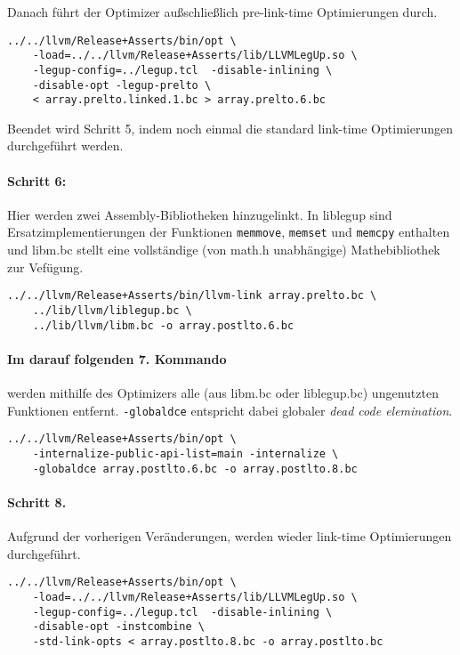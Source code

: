 \documentclass[oneside,a4paper]{article}
\def\B#1{\lstinline[style=bash]{#1}}
\def\C#1{\lstinline[style=c]{#1}}
\begin{document}
Danach führt der Optimizer außschließlich pre-link-time Optimierungen durch.
\begin{lstlisting}[style=bash]
../../llvm/Release+Asserts/bin/opt \
    -load=../../llvm/Release+Asserts/lib/LLVMLegUp.so \
    -legup-config=../legup.tcl  -disable-inlining \
    -disable-opt -legup-prelto \
    < array.prelto.linked.1.bc > array.prelto.6.bc
\end{lstlisting}

Beendet wird Schritt 5, indem noch einmal die standard link-time Optimierungen
durchgeführt werden.

\paragraph{Schritt 6:} Hier werden zwei Assembly-Bibliotheken hinzugelinkt.
In liblegup sind Ersatzimplementierungen der Funktionen \C{memmove},
\C{memset} und \C{memcpy} enthalten und libm.bc stellt
eine vollständige (von math.h unabhängige) Mathebibliothek zur Vefügung.
\begin{lstlisting}[style=bash]
../../llvm/Release+Asserts/bin/llvm-link array.prelto.bc \
    ../lib/llvm/liblegup.bc \
    ../lib/llvm/libm.bc -o array.postlto.6.bc
\end{lstlisting}

\paragraph{Im darauf folgenden 7. Kommando} werden mithilfe des Optimizers
alle (aus libm.bc oder liblegup.bc) ungenutzten Funktionen entfernt.
\B{-globaldce} entspricht dabei globaler \emph{dead code elemination}.
\begin{lstlisting}[style=bash]
../../llvm/Release+Asserts/bin/opt \
    -internalize-public-api-list=main -internalize \
    -globaldce array.postlto.6.bc -o array.postlto.8.bc
\end{lstlisting}

\paragraph{Schritt 8.} Aufgrund der vorherigen Veränderungen,
werden wieder link-time Optimierungen durchgeführt.
\begin{lstlisting}[style=bash]
../../llvm/Release+Asserts/bin/opt \
    -load=../../llvm/Release+Asserts/lib/LLVMLegUp.so \
    -legup-config=../legup.tcl  -disable-inlining \
    -disable-opt -instcombine \
    -std-link-opts < array.postlto.8.bc -o array.postlto.bc
\end{lstlisting}
\end{document}
